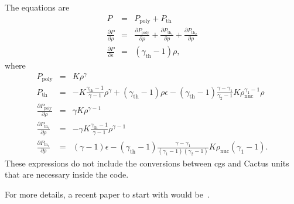 The equations are
\begin{eqnarray}
  \label{eq:eosformulas}
  P & = & P_{\text{poly}} + P_{\text{th}} \\
  \frac{\partial P}{\partial \rho} & = & \frac{\partial
  P_{\text{poly}}}{\partial \rho} + \frac{\partial
  P_{\text{th}_1}}{\partial \rho} + \frac{\partial
  P_{\text{th}_2}}{\partial \rho}  \\
  \frac{\partial P}{\partial \epsilon} & = & (\gamma_{\text{th}} - 1)
  \rho,
\end{eqnarray}
where
\begin{eqnarray}
  \label{eq:eostemps}
  P_{\text{poly}} & = & K \rho^{\gamma} \\
  P_{\text{th}} & = & -K \frac{\gamma_{\text{th}} - 1}{\gamma - 1}
  \rho^{\gamma} + (\gamma_{\text{th}} - 1) \rho \epsilon -
  (\gamma_{\text{th}} - 1) \frac{\gamma - \gamma_1}{\gamma_2 - 1} K
  \rho_{\text{nuc}}^{\gamma_1 - 1} \rho \\
  \frac{\partial P_{\text{poly}}}{\partial \rho} & = & \gamma K
  \rho^{\gamma - 1} \\ 
  \frac{\partial P_{\text{th}_1}}{\partial \rho} & = & - \gamma K
  \frac{\gamma_{\text{th}} - 1}{\gamma - 1} \rho^{\gamma -1} \\
  \frac{\partial P_{\text{th}_2}}{\partial \rho} & = & (\gamma - 1)
  \epsilon - (\gamma_{\text{th}} - 1) \frac{\gamma -
  \gamma_1}{(\gamma_1 - 1)(\gamma_2 - 1)} K \rho_{\text{nuc}}
  (\gamma_1 - 1).
\end{eqnarray}
These expressions do not include the conversions between cgs and
Cactus units that are necessary inside the code.

For more details, a recent paper to start with would
be~\cite{Dimm05}. 






